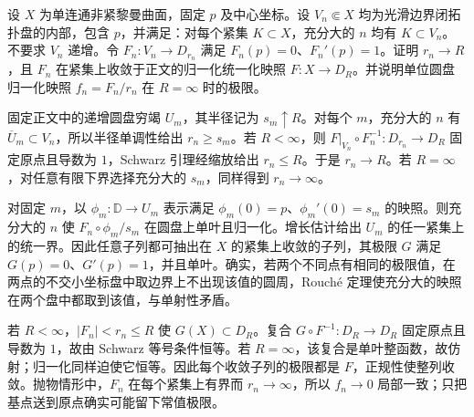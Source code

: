 \begin{exercise}
	\label{g4:ex:0503:nonnested-exhaustion}
	设 \(X\) 为单连通非紧黎曼曲面，固定 \(p\) 及中心坐标。设 \(V_n\Subset X\) 均为光滑边界闭拓扑盘的内部，包含 \(p\)，并满足：对每个紧集 \(K\subset X\)，充分大的 \(n\) 均有 \(K\subset V_n\)。不要求 \(V_n\) 递增。令 \(F_n:V_n\to D_{r_n}\) 满足 \(F_n(p)=0\)、\(F_n'(p)=1\)。证明 \(r_n\to R\)，且 \(F_n\) 在紧集上收敛于正文的归一化统一化映照 \(F:X\to D_R\)。并说明单位圆盘归一化映照 \(f_n=F_n/r_n\) 在 \(R=\infty\) 时的极限。
\end{exercise}
\begin{solution}
	固定正文中的递增圆盘穷竭 \(U_m\)，其半径记为 \(s_m\uparrow R\)。对每个 \(m\)，充分大的 \(n\) 有 \(\overline U_m\subset V_n\)，所以半径单调性给出 \(r_n\ge s_m\)。若 \(R<\infty\)，则 \(F|_{V_n}\circ F_n^{-1}:D_{r_n}\to D_R\) 固定原点且导数为 \(1\)，Schwarz 引理经缩放给出 \(r_n\le R\)。于是 \(r_n\to R\)。若 \(R=\infty\)，对任意有限下界选择充分大的 \(s_m\)，同样得到 \(r_n\to\infty\)。

	对固定 \(m\)，以 \(\phi_m:\mathbb D\to U_m\) 表示满足 \(\phi_m(0)=p\)、\(\phi_m'(0)=s_m\) 的映照。则充分大的 \(n\) 使 \(F_n\circ\phi_m/s_m\) 在圆盘上单叶且归一化。增长估计给出 \(U_m\) 的任一紧集上的统一界。因此任意子列都可抽出在 \(X\) 的紧集上收敛的子列，其极限 \(G\) 满足 \(G(p)=0\)、\(G'(p)=1\)，并且单叶。确实，若两个不同点有相同的极限值，在两点的不交小坐标盘中取边界上不出现该值的圆周，Rouché 定理使充分大的映照在两个盘中都取到该值，与单射性矛盾。

	若 \(R<\infty\)，\(|F_n|<r_n\le R\) 使 \(G(X)\subset D_R\)。复合 \(G\circ F^{-1}:D_R\to D_R\) 固定原点且导数为 \(1\)，故由 Schwarz 等号条件恒等。若 \(R=\infty\)，该复合是单叶整函数，故仿射；归一化同样迫使它恒等。因此每个收敛子列的极限都是 \(F\)，正规性使整列收敛。抛物情形中，\(F_n\) 在每个紧集上有界而 \(r_n\to\infty\)，所以 \(f_n\to0\) 局部一致；只把基点送到原点确实可能留下常值极限。
\end{solution}


